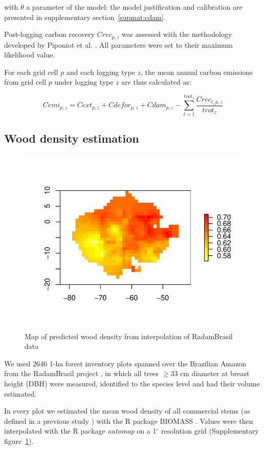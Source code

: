 \documentclass[12pt]{article}
\begin{document}
with $\theta$ a parameter of the model: the model justification and calibration are presented in supplementary section~\ref{supmat:cdam}. 

Post-logging carbon recovery $Crec_{p,z}$ was assessed with the methodology developed by Piponiot et al. \cite{Piponiot2016a}.  
All parameters were set to their maximum likelihood value. 

For each grid cell $p$ and each logging type $z$, the mean annual carbon emissions from grid cell $p$ under logging type $z$ are thus calculated as: 

\begin{equation}
\label{eq:cemi}
    Cemi_{p,z} = Cext_{p,z} + Cdefor_{p,z} + Cdam_{p,z} -  \sum_{t=1}^{trot_z} \frac{Crec_{t,p,z}}{trot_z} 
\end{equation}


\subsection{Wood density estimation}
\label{supmat:wdext}

\begin{figure}
    \centering
    \includegraphics[width=0.7\linewidth]{graphs/map_WDext.pdf}
    \caption{Map of predicted wood density from interpolation of RadamBrasil data}
    \label{sfig:wdext}
\end{figure}

We used 2646 1-ha forest inventory plots spanned over the Brazilian Amazon from the RadamBrasil project \cite{Radam2017}, in which all trees $\geq$33 cm diameter at breast height (DBH) were measured, identified to the species level and had their volume estimated. 

In every plot we estimated the mean wood density of all commercial stems (as defined in a previous study \cite{Piponiot2019}) with the R package BIOMASS \cite{Rejou-Mechain2017}.
Values were then interpolated with the R package \textit{automap} \cite{gstat} on a 1$^{\circ}$ resolution grid (Supplementary figure~\ref{sfig:wdext}).
\end{document}
